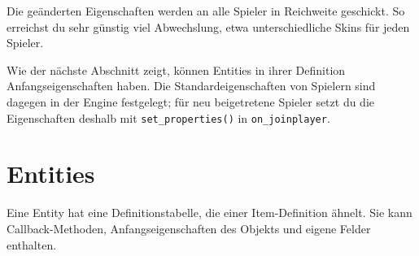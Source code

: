 Die geänderten Eigenschaften werden an alle Spieler in Reichweite
geschickt. So erreichst du sehr günstig viel Abwechslung, etwa
unterschiedliche Skins für jeden Spieler.

Wie der nächste Abschnitt zeigt, können Entities in ihrer Definition
Anfangseigenschaften haben. Die Standardeigenschaften von Spielern sind
dagegen in der Engine festgelegt; für neu beigetretene Spieler setzt du
die Eigenschaften deshalb mit \texttt{set\_\allowbreak{}properties()} in
\texttt{on\_\allowbreak{}joinplayer}.

\section{Entities}\label{entities}

Eine Entity hat eine Definitionstabelle, die einer Item-Definition
ähnelt. Sie kann Callback-Methoden, Anfangseigenschaften des Objekts und
eigene Felder enthalten.

\begin{Shaded}
\begin{Highlighting}[]
  \OperatorTok{=} \OperatorTok{\{}
     \OperatorTok{=} \OperatorTok{\{}
         \OperatorTok{=} \OperatorTok{,}
         \OperatorTok{=} \OperatorTok{,}
         \OperatorTok{=} \OperatorTok{,}
         \OperatorTok{=} \OperatorTok{\{} \OperatorTok{{-}}\OperatorTok{,} \OperatorTok{{-}}\OperatorTok{,} \OperatorTok{{-}}\OperatorTok{,} \OperatorTok{,} \OperatorTok{,}  \OperatorTok{\},}
         \OperatorTok{=} \OperatorTok{,}
         \OperatorTok{=} \OperatorTok{\{}  \OperatorTok{=} \OperatorTok{,}  \OperatorTok{=}  \OperatorTok{\},}
         \OperatorTok{=} \OperatorTok{\{}  \OperatorTok{\},}
         \OperatorTok{=} \OperatorTok{\{}  \OperatorTok{=} \OperatorTok{,}  \OperatorTok{=}  \OperatorTok{\},}
         \OperatorTok{=} \OperatorTok{\{}  \OperatorTok{=} \OperatorTok{,}  \OperatorTok{=}  \OperatorTok{\},}
    \OperatorTok{\},}

     \OperatorTok{=} \OperatorTok{,}
\OperatorTok{\}}

 \OperatorTok{:}\OperatorTok{(}\OperatorTok{)}
     \OperatorTok{=} 
\end{Highlighting}
\end{Shaded}

